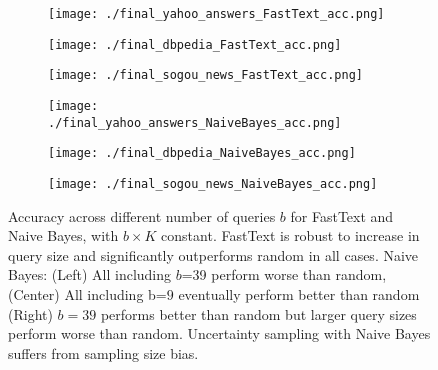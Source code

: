 \documentclass[11pt,a4paper]{article}
\begin{document}
\begin{figure*}[!th]
\begin{subfigure}[h]{0.33\linewidth}
\texttt{[image: ./final\_yahoo\_answers\_FastText\_acc.png]}
\end{subfigure}
\begin{subfigure}[h]{0.33\linewidth}
\texttt{[image: ./final\_dbpedia\_FastText\_acc.png]}
\end{subfigure}
\begin{subfigure}[h]{0.33\linewidth}
\texttt{[image: ./final\_sogou\_news\_FastText\_acc.png]}
\end{subfigure}
\begin{subfigure}[h]{0.33\linewidth}
\texttt{[image: ./final\_yahoo\_answers\_NaiveBayes\_acc.png]}
\end{subfigure}
\begin{subfigure}[h]{0.33\linewidth}
\texttt{[image: ./final\_dbpedia\_NaiveBayes\_acc.png]}
\end{subfigure}
\begin{subfigure}[h]{0.33\linewidth}
\texttt{[image: ./final\_sogou\_news\_NaiveBayes\_acc.png]}
\end{subfigure}
\caption{Accuracy across different number of queries $b$ for FastText and Naive Bayes, with  $b \times K$ constant. FastText is robust to increase in query size and significantly outperforms random in all cases. Naive Bayes: (Left) All including $b$=39 perform worse than random, (Center) All including b=$9$ eventually perform better than random (Right) $b=39$ performs better than random but larger query sizes perform worse than random. Uncertainty sampling with Naive Bayes suffers from sampling size bias.} 
\label{fig:sampling_biases}
\end{figure*}
\end{document}
